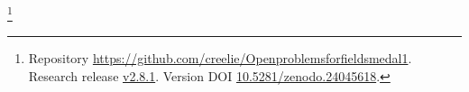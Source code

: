\thanks{Repository \url{https://github.com/creelie/Openproblemsforfieldsmedal1}. Research release \href{https://github.com/creelie/Openproblemsforfieldsmedal1/releases/tag/v2.8.1}{v2.8.1}. Version DOI \href{https://doi.org/10.5281/zenodo.24045618}{10.5281/zenodo.24045618}.}
